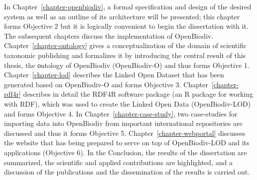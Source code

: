 In Chapter~\ref{chapter-openbiodiv}, a formal specification and design of the desired system as well as an outline of its architecture will be presented; this chapter forms Objective 2 but it is logically convenient to begin the dissertation with it. The subsequent chapters discuss the implementation of OpenBiodiv. Chapter~\ref{chapter-ontology} gives a conceptualization of the domain of scientific taxonomic publishing and formalizes it by introducing the central result of this thesis, the оntology of OpenBiodiv (OpenBiodiv-O) and thus forms Objective 1. Chapter~\ref{chapter-lod} describes the Linked Open Dataset that has been generated based on OpenBiodiv-O and forms Objective 3. Chapter~\ref{chapter-rdf4r} describes in detail the RDF4R software package (an R package for working with RDF), which was used to create the Linked Open Data (OpenBiodiv-LOD) and forms Objective 4. In Chapter~\ref{chapter-case-study}, two case-studies for importing data into OpenBiodiv from important international repositories are discussed and thus it forms Objective 5. Chapter~\ref{chapter-webportal} discusses the website that has being prepared to serve on top of OpenBiodiv-LOD and its applications (Objective 6). In the Conclusion, the results of the dissertation are summarized, the scientific and applied contributions are highlighted, and a discussion of the publications and the dissemination of the results is carried out.





